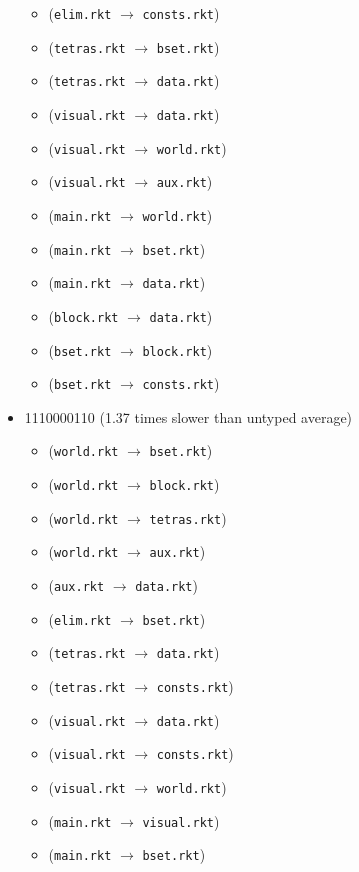 \documentclass{article}
\newcommand{\mono}[1]{\texttt{#1}}
\begin{document}
\begin{itemize}
\begin{itemize}
  \item (\mono{elim.rkt} $\rightarrow$ \mono{consts.rkt})
  \item (\mono{tetras.rkt} $\rightarrow$ \mono{bset.rkt})
  \item (\mono{tetras.rkt} $\rightarrow$ \mono{data.rkt})
  \item (\mono{visual.rkt} $\rightarrow$ \mono{data.rkt})
  \item (\mono{visual.rkt} $\rightarrow$ \mono{world.rkt})
  \item (\mono{visual.rkt} $\rightarrow$ \mono{aux.rkt})
  \item (\mono{main.rkt} $\rightarrow$ \mono{world.rkt})
  \item (\mono{main.rkt} $\rightarrow$ \mono{bset.rkt})
  \item (\mono{main.rkt} $\rightarrow$ \mono{data.rkt})
  \item (\mono{block.rkt} $\rightarrow$ \mono{data.rkt})
  \item (\mono{bset.rkt} $\rightarrow$ \mono{block.rkt})
  \item (\mono{bset.rkt} $\rightarrow$ \mono{consts.rkt})
  \end{itemize}
\item 1110000110 (1.37 times slower than untyped average)
  \begin{itemize}
  \item (\mono{world.rkt} $\rightarrow$ \mono{bset.rkt})
  \item (\mono{world.rkt} $\rightarrow$ \mono{block.rkt})
  \item (\mono{world.rkt} $\rightarrow$ \mono{tetras.rkt})
  \item (\mono{world.rkt} $\rightarrow$ \mono{aux.rkt})
  \item (\mono{aux.rkt} $\rightarrow$ \mono{data.rkt})
  \item (\mono{elim.rkt} $\rightarrow$ \mono{bset.rkt})
  \item (\mono{tetras.rkt} $\rightarrow$ \mono{data.rkt})
  \item (\mono{tetras.rkt} $\rightarrow$ \mono{consts.rkt})
  \item (\mono{visual.rkt} $\rightarrow$ \mono{data.rkt})
  \item (\mono{visual.rkt} $\rightarrow$ \mono{consts.rkt})
  \item (\mono{visual.rkt} $\rightarrow$ \mono{world.rkt})
  \item (\mono{main.rkt} $\rightarrow$ \mono{visual.rkt})
  \item (\mono{main.rkt} $\rightarrow$ \mono{bset.rkt})

\end{itemize}
\end{itemize}
\end{document}
